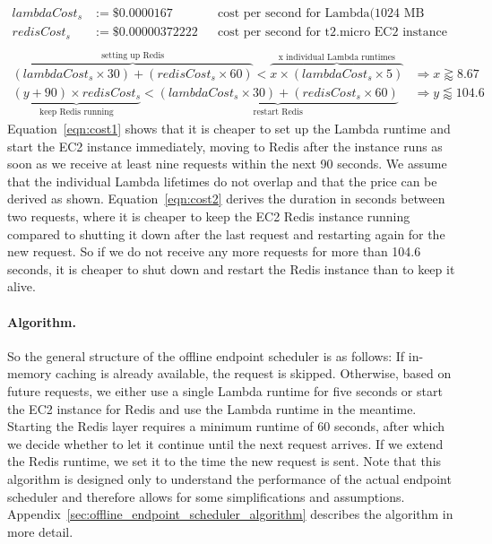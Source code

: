 \begin{align*}
    lambdaCost_{s} &:= \$0.0000167 && \text{cost per second for Lambda(1024 MB memory)}\\
    redisCost_{s} &:= \$0.00000372222 && \text{cost per second for t2.micro EC2 instance (1 GiB memory)} \\
\end{align*}
\begin{align}
    \label{eqn:cost1}
    \overbrace{(lambdaCost_{s} \times 30) + (redisCost_{s} \times 60)}^{\text{setting up Redis}} < \overbrace{x \times (lambdaCost_{s} \times 5)}^{\text{x individual Lambda runtimes}} &\Rightarrow x \gtrapprox 8.67 \\ 
    \underbrace{(y+90) \times redisCost_{s}}_{\text{keep Redis running}} < \underbrace{(lambdaCost_{s} \times 30) + (redisCost_{s} \times 60)}_{\text{restart Redis}} &\Rightarrow y \lessapprox 104.6 \label{eqn:cost2}
\end{align}
Equation~\ref{eqn:cost1} shows that it is cheaper to set up the Lambda runtime and start the EC2 instance immediately, moving to Redis after the instance runs as soon as we receive at least nine requests within the next 90 seconds. We assume that the individual Lambda lifetimes do not overlap and that the price can be derived as shown. Equation~\ref{eqn:cost2} derives the duration in seconds between two requests, where it is cheaper to keep the EC2 Redis instance running compared to shutting it down after the last request and restarting again for the new request. So if we do not receive any more requests for more than 104.6 seconds, it is cheaper to shut down and restart the Redis instance than to keep it alive.

\paragraph{Algorithm.} 
So the general structure of the offline endpoint scheduler is as follows: If in-memory caching is already available, the request is skipped. Otherwise, based on future requests, we either use a single Lambda runtime for five seconds or start the EC2 instance for Redis and use the Lambda runtime in the meantime. Starting the Redis layer requires a minimum runtime of 60 seconds, after which we decide whether to let it continue until the next request arrives. If we extend the Redis runtime, we set it to the time the new request is sent. Note that this algorithm is designed only to understand the performance of the actual endpoint scheduler and therefore allows for some simplifications and assumptions. Appendix~\ref{sec:offline_endpoint_scheduler_algorithm} describes the algorithm in more detail.


